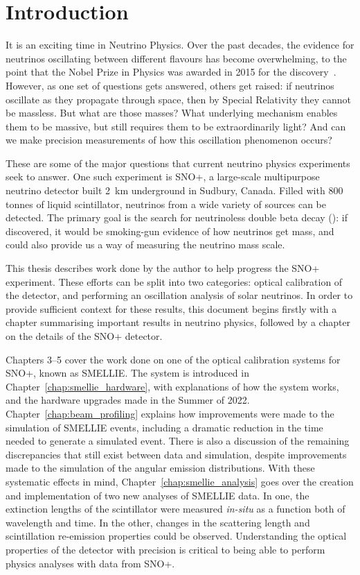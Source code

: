 \chapter*{Introduction}\label{chap:intro}
It is an exciting time in Neutrino Physics. Over the past decades, the evidence for neutrinos oscillating between different flavours has become overwhelming, to the point that the Nobel Prize in Physics was awarded in 2015 for the discovery~\cite{NobelPrizePhysics2015}. However, as one set of questions gets answered, others get raised: if neutrinos oscillate as they propagate through space, then by Special Relativity they cannot be massless. But what are those masses? What underlying mechanism enables them to be massive, but still requires them to be extraordinarily light? And can we make precision measurements of how this oscillation phenomenon occurs?

These are some of the major questions that current neutrino physics experiments seek to answer. One such experiment is SNO+, a large-scale multipurpose neutrino detector built \SI{2}{\km} underground in Sudbury, Canada. Filled with 800 tonnes of liquid scintillator, neutrinos from a wide variety of sources can be detected. The primary goal is the search for neutrinoless double beta decay (\onbb{}): if discovered, it would be smoking-gun evidence of how neutrinos get mass, and could also provide us a way of measuring the neutrino mass scale.

This thesis describes work done by the author to help progress the SNO+ experiment. These efforts can be split into two categories: optical calibration of the detector, and performing an oscillation analysis of solar neutrinos. In order to provide sufficient context for these results, this document begins firstly with a chapter summarising important results in neutrino physics, followed by a chapter on the details of the SNO+ detector.

Chapters 3--5 cover the work done on one of the optical calibration systems for SNO+, known as SMELLIE. The system is introduced in Chapter~\ref{chap:smellie_hardware}, with explanations of how the system works, and the hardware upgrades made in the Summer of 2022. Chapter~\ref{chap:beam_profiling} explains how improvements were made to the simulation of SMELLIE events, including a dramatic reduction in the time needed to generate a simulated event. There is also a discussion of the remaining discrepancies that still exist between data and simulation, despite improvements made to the simulation of the angular emission distributions. With these systematic effects in mind, Chapter~\ref{chap:smellie_analysis} goes over the creation and implementation of two new analyses of SMELLIE data. In one, the extinction lengths of the scintillator were measured \textit{in-situ} as a function both of wavelength and time. In the other, changes in the scattering length and scintillation re-emission properties could be observed. Understanding the optical properties of the detector with precision is critical to being able to perform physics analyses with data from SNO+.

